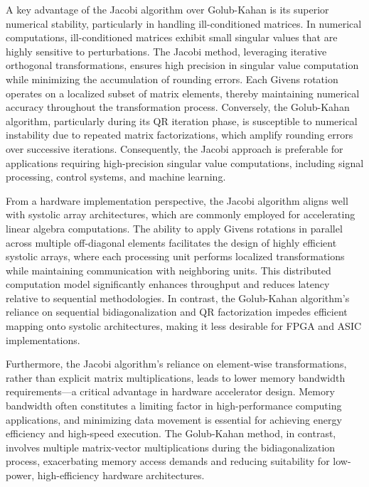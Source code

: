 A key advantage of the Jacobi algorithm over Golub-Kahan is its superior numerical stability, particularly in handling ill-conditioned matrices. In numerical computations, ill-conditioned matrices exhibit small singular values that are highly sensitive to perturbations. The Jacobi method, leveraging iterative orthogonal transformations, ensures high precision in singular value computation while minimizing the accumulation of rounding errors. Each Givens rotation operates on a localized subset of matrix elements, thereby maintaining numerical accuracy throughout the transformation process. Conversely, the Golub-Kahan algorithm, particularly during its QR iteration phase, is susceptible to numerical instability due to repeated matrix factorizations, which amplify rounding errors over successive iterations. Consequently, the Jacobi approach is preferable for applications requiring high-precision singular value computations, including signal processing, control systems, and machine learning\cite{svd-hardware-3}.

From a hardware implementation perspective, the Jacobi algorithm aligns well with systolic array architectures, which are commonly employed for accelerating linear algebra computations. The ability to apply Givens rotations in parallel across multiple off-diagonal elements facilitates the design of highly efficient systolic arrays, where each processing unit performs localized transformations while maintaining communication with neighboring units. This distributed computation model significantly enhances throughput and reduces latency relative to sequential methodologies\cite{svd-hardware-4}. In contrast, the Golub-Kahan algorithm’s reliance on sequential bidiagonalization and QR factorization impedes efficient mapping onto systolic architectures, making it less desirable for FPGA and ASIC implementations.

Furthermore, the Jacobi algorithm’s reliance on element-wise transformations, rather than explicit matrix multiplications, leads to lower memory bandwidth requirements—a critical advantage in hardware accelerator design. Memory bandwidth often constitutes a limiting factor in high-performance computing applications, and minimizing data movement is essential for achieving energy efficiency and high-speed execution. The Golub-Kahan method, in contrast, involves multiple matrix-vector multiplications during the bidiagonalization process, exacerbating memory access demands and reducing suitability for low-power, high-efficiency hardware architectures.

